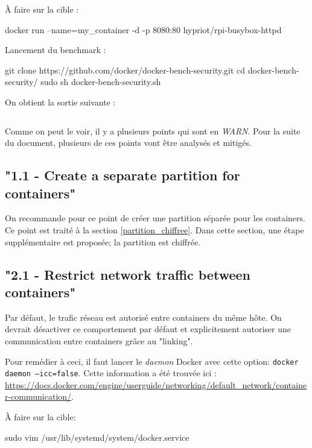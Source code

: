 \documentclass[11pt,a4paper,oneside]{report}
\newcommand{\code}[1]{\texttt{#1}}
\begin{document}
À faire sur la cible :
\begin{bashcode}
docker run --name=my_container -d -p 8080:80 hypriot/rpi-busybox-httpd
\end{bashcode}

Lancement du benchmark :
\begin{bashcode}
git clone https://github.com/docker/docker-bench-security.git
cd docker-bench-security/
sudo sh docker-bench-security.sh
\end{bashcode}

On obtient la sortie suivante :

\inputminted[xleftmargin=20pt, linenos=true, breaklines=true, frame=single, framesep=6pt, tabsize=2, fontfamily=courier, fontsize=\small]{text}{../../docker_security_benchmark/vanilla.log}


Comme on peut le voir, il y a plusieurs points qui sont en \textit{WARN}. Pour la suite du document, plusieurs de ces points vont être analysés et mitigés.


\subsection{"1.1  - Create a separate partition for containers"}
On recommande pour ce point de créer une partition séparée pour les containers. Ce point est traité à la section \ref{partition_chiffree}. Dans cette section, une étape supplémentaire est proposée; la partition est chiffrée.


\subsection{"2.1  - Restrict network traffic between containers"}\label{ssc-restrict-network-traffic-containers}
Par défaut, le trafic réseau est autorisé entre containers du même hôte. On devrait désactiver ce comportement par défaut et explicitement autoriser une communication entre containers grâce au "linking".

Pour remédier à ceci, il faut lancer le \textit{daemon} Docker avec cette option: \code{docker daemon --icc=false}. Cette information a été trouvée ici : \url{https://docs.docker.com/engine/userguide/networking/default_network/container-communication/}.

À faire sur la cible:

\begin{bashcode}
sudo vim /usr/lib/systemd/system/docker.service
\end{bashcode}
\end{document}

